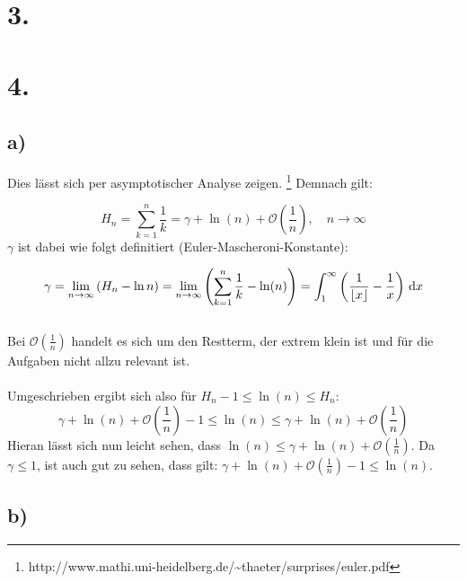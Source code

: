 \documentclass[a4paper]{scrartcl}
\begin{document}
\section{3.}

\section{4.}
\subsection{a)}
Dies lässt sich per asymptotischer Analyse zeigen. \footnote{http://www.mathi.uni-heidelberg.de/\textasciitilde thaeter/surprises/euler.pdf}
Demnach gilt:

\[H_n=\sum_{k=1}^n \frac{1}{k} = \gamma + \ln (n) +\mathcal O\!\left(\frac 1{n}\right),\quad n\to\infty \]
%
\(\gamma\) ist dabei wie folgt definitiert (Euler-Mascheroni-Konstante):

\[ \gamma = \lim_{n\to\infty} \left(H_n - \ln n\right) = \lim_{n \rightarrow \infty } \left(\sum_{k=1}^n \frac{1}{k} - \ln(n) \right)=\int_1^\infty\left({1\over\lfloor x\rfloor}-{1\over x}\right)\,\mathrm dx \] \\
%
Bei \(\mathcal O\!\left(\frac 1{n}\right)\) handelt es sich um den Restterm, der extrem klein ist und für die Aufgaben nicht allzu relevant ist. \\ \\
%
Umgeschrieben ergibt sich also für \(H_n -1 \leq \ln (n) \leq H_n \):
\[ \gamma + \ln (n) +\mathcal O\!\left(\frac 1{n}\right) -1 \leq \ln (n) \leq \gamma + \ln (n) +\mathcal O\!\left(\frac 1{n}\right)\]
%
Hieran lässt sich nun leicht sehen, dass \( \ln (n) \leq \gamma + \ln (n) +\mathcal O\!\left(\frac 1{n}\right) \). Da \(\gamma \leq 1\), ist auch gut zu sehen, dass gilt: \( \gamma + \ln (n) +\mathcal O\!\left(\frac 1{n}\right) -1 \leq \ln (n) \).

\subsection{b)}
\end{document}
